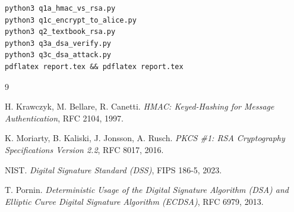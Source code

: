 \documentclass[11pt,a4paper]{article}
\begin{document}
\begin{verbatim}
python3 q1a_hmac_vs_rsa.py
python3 q1c_encrypt_to_alice.py
python3 q2_textbook_rsa.py
python3 q3a_dsa_verify.py
python3 q3c_dsa_attack.py
pdflatex report.tex && pdflatex report.tex
\end{verbatim}

\begin{thebibliography}{9}

H. Krawczyk, M. Bellare, R. Canetti.
\newblock \emph{HMAC: Keyed-Hashing for Message Authentication}, RFC 2104, 1997.

K. Moriarty, B. Kaliski, J. Jonsson, A. Rusch.
\newblock \emph{PKCS \#1: RSA Cryptography Specifications Version 2.2}, RFC 8017, 2016.

NIST.
\newblock \emph{Digital Signature Standard (DSS)}, FIPS 186-5, 2023.

T. Pornin.
\newblock \emph{Deterministic Usage of the Digital Signature Algorithm (DSA) and
Elliptic Curve Digital Signature Algorithm (ECDSA)}, RFC 6979, 2013.

\end{thebibliography}
\end{document}
